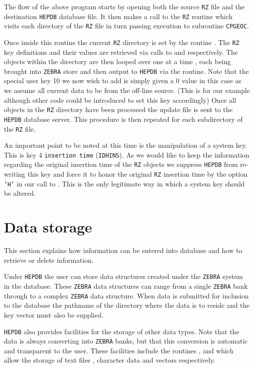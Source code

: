 The flow of the above program starts by opening both the source {\tt RZ} file
and the destination {\tt HEPDB} database file. It then makes a call to the {\tt RZ}
routine  which visits each directory of the {\tt RZ} file in turn
passing execution to subroutine {\tt CPGEOC}.
\par
Once inside this routine the current {\tt RZ} directory is set by the
routine . The {\tt RZ} key definitions  and their values
are retrieved via calls to  and  respectively.
The objects within the directory are then looped over one at a time , each being
brought into {\tt ZEBRA} store and then output to {\tt HEPDB} via the
 routine. Note that the special user key 10 we now wish to add
is simply given a 0 value in this case as we assume all current data to be
from the off-line source. (This is for our example although other code could
be introduced to set this key accordingly) Once all objects in the {\tt RZ}
directory have been processed the update file is sent to the {\tt HEPDB} database
server.  This procedure is then repeated for each subdirectory of the
{\tt RZ} file.

An important point to be noted at this time is the manipulation of a system key.
This is key 4 {\tt insertion time} ({\tt IDHINS}). As we would like to keep the
information regarding the original insertion time of the {\tt RZ} objects
we suppress {\tt HEPDB} from re-writing this key and force it to honor the
original {\tt RZ} insertion time by the option {\tt `H'} in our call to .
This is the only legitimate way in which a system key should be altered.
%
%
%
\section{Data storage}
This section explains how information can be entered into database
and how to retrieve or delete information.

Under {\tt HEPDB} the user can store data structures created under the
{\tt ZEBRA} system in the database. These {\tt ZEBRA} data structures can
range from a single {\tt ZEBRA} bank through to a complex {\tt ZEBRA}
data structure. When data is submitted for inclusion to the database
the pathname of the directory where the data is to reside and the
key vector must also be supplied.

{\tt HEPDB} also provides facilities for the storage of other data types.
Note that the data is always converting into {\tt ZEBRA} banks,
but that this conversion is automatic and transparent to the user.
These facilities include the
routines ,  and  which allow
the storage of text files , character data and vectors respectively.
%
%
%
